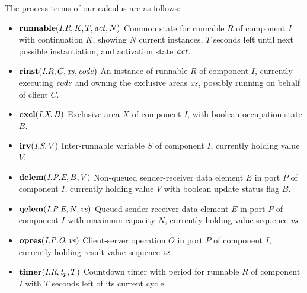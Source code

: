 \documentclass[twocolumn]{article}
\begin{document}
The process terms of our calculus are as follows:
\begin{itemize}
\item $\Trunnable{\Tr{R}{I}}{K}{T}{\Act}{N}$  \newline
Common state for runnable $R$ of component $I$ with continuation $K$, showing $N$ current instances, $T$ seconds left until next possible instantiation, and activation state $\Act$.
\item $\Trinst{\Tr{R}{I}}{C}{\Xs}{\Code}$ \newline
An instance of runnable $R$ of component $I$, currently executing $\Code$ and owning the exclusive areas $\Xs$, possibly running on behalf of client $C$.
\item $\Texcl{\Tx{X}{I}}{B}$ \newline
Exclusive area $X$ of component $I$, with boolean occupation state $B$.
\item $\Tirv{\Ts{S}{I}}{V}$ \newline
Inter-runnable variable $S$ of component $I$, currently holding value $V$.
\item $\Tdelem{\Tep{E}{P}{I}}{B}{V}$ \newline
Non-queued sender-receiver data element $E$ in port $P$ of component $I$, currently holding value $V$ with boolean update status flag $B$.
\item $\Tqelem{\Tep{E}{P}{I}}{N}{\Vs}$ \newline
Queued sender-receiver data element $E$ in port $P$ of component $I$ with maximum capacity $N$, currently holding value sequence $\Vs$.
\item $\Topres{\Top{O}{P}{I}}{\Vs}$ \newline
Client-server operation $O$ in port $P$ of component $I$, currently holding result value sequence $\Vs$.
\item $\Ttimer{\Tr{R}{I}}{\V{T_p}}{T}$ \newline
Countdown timer with period  for runnable $R$ of component $I$ with $T$ seconds left of its current cycle.
\end{itemize}
\end{document}
